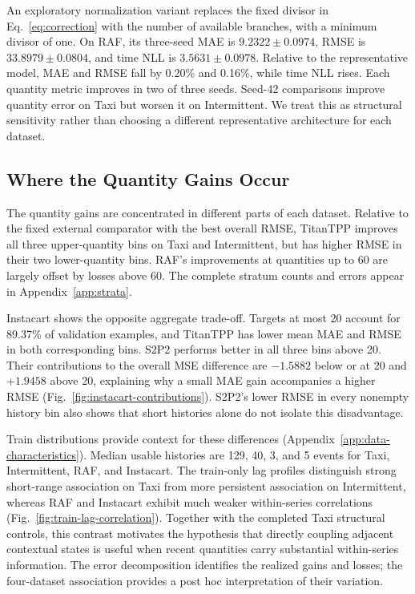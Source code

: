 \documentclass[runningheads]{llncs}
\begin{document}
An exploratory normalization variant replaces the fixed divisor in
Eq.~\eqref{eq:correction} with the number of available branches, with a
minimum divisor of one. On RAF, its three-seed MAE is $9.2322\pm0.0974$,
RMSE is $33.8979\pm0.0804$, and time NLL is $3.5631\pm0.0978$.
Relative to the representative model, MAE and RMSE fall by 0.20\% and
0.16\%, while time NLL rises. Each quantity metric improves in two of three
seeds. Seed-42 comparisons improve quantity error on Taxi but worsen it on
Intermittent. We treat this as structural sensitivity rather than choosing a
different representative architecture for each dataset.

\subsection{Where the Quantity Gains Occur}
The quantity gains are concentrated in different parts of each dataset.
Relative to the fixed external comparator with the best overall RMSE,
TitanTPP improves all three upper-quantity bins on Taxi and Intermittent,
but has higher RMSE in their two lower-quantity bins. RAF's improvements
at quantities up to 60 are largely offset by losses above 60. The complete
stratum counts and errors appear in Appendix~\ref{app:strata}.

Instacart shows the opposite aggregate trade-off. Targets at most 20 account
for 89.37\% of validation examples, and TitanTPP has lower mean MAE and RMSE
in both corresponding bins. S2P2 performs better in all three bins above 20.
Their contributions to the overall MSE difference are $-1.5882$ below or at
20 and $+1.9458$ above 20, explaining why a small MAE gain accompanies a
higher RMSE (Fig.~\ref{fig:instacart-contributions}). S2P2's lower RMSE
in every nonempty history bin also shows that short histories alone do not
isolate this disadvantage.

Train distributions provide context for these differences
(Appendix~\ref{app:data-characteristics}). Median usable histories are
129, 40, 3, and 5 events for Taxi, Intermittent, RAF, and Instacart.
The train-only lag profiles distinguish strong short-range association on
Taxi from more persistent association on Intermittent, whereas RAF and
Instacart exhibit much weaker within-series correlations
(Fig.~\ref{fig:train-lag-correlation}). Together with the completed Taxi
structural controls, this contrast motivates the hypothesis that directly
coupling adjacent contextual states is useful when recent quantities carry
substantial within-series information. The error decomposition identifies
the realized gains and losses; the four-dataset association provides a
post hoc interpretation of their variation.
\end{document}
